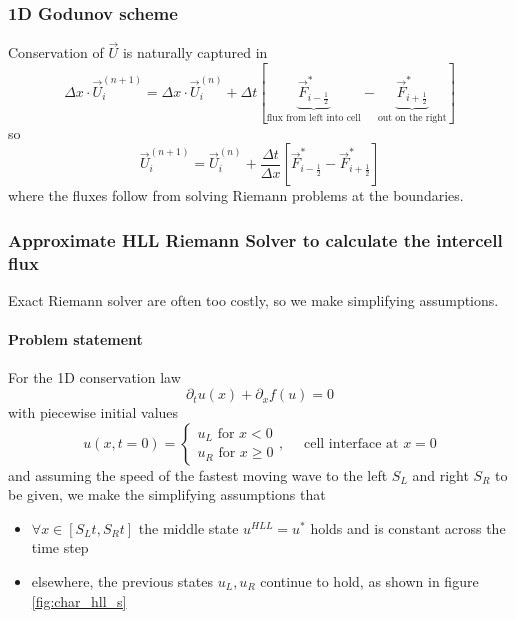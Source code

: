 \subsubsection*{1D Godunov scheme} Conservation of $\vec{U}$ is naturally captured in
\begin{equation}
    \Delta x \cdot \vec{U}_i^{(n+1)}= \Delta x \cdot \vec{U}_i^{(n)} + \Delta t \left[\underbrace{\vec{F}^*_{i-\frac{1}{2}}}_{\text{flux from left into cell}}-\underbrace{\vec{F}^*_{i+\frac{1}{2}}}_{\text{out on the right}}\right]
\end{equation}
so
\begin{equation}
    \vec{U}_i^{(n+1)}=\vec{U}_i^{(n)}+\frac{\Delta t}{\Delta x}\left[\vec{F}^*_{i-\frac{1}{2}}-\vec{F}^*_{i+\frac{1}{2}}\right]
\end{equation}
where the fluxes follow from solving Riemann problems at the boundaries.

\subsubsection*{Approximate HLL Riemann Solver to calculate the intercell flux}
Exact Riemann solver are often too costly, so we make simplifying assumptions.
\paragraph*{Problem statement} For the 1D conservation law
\begin{equation}
    \partial_t u(x) + \partial_x f(u) = 0
\end{equation}
with piecewise initial values
\begin{equation}
    u(x, t=0)=\left\{\begin{array}{l}
    u_L \text { for } x<0 \\
    u_R \text { for } x \geq 0
    \end{array}, \quad \text { cell interface at } x=0\right.
\end{equation}
and assuming the speed of the fastest moving wave to the left $S_L$ and
right $S_R$ to be given, we make the simplifying assumptions that
\begin{itemize}
    \item $\forall x \in [S_Lt,S_Rt]$ the middle state $u^{HLL} = u^*$ holds and is constant across the time step
    \item elsewhere, the previous states $u_L,u_R$ continue to hold, as shown in figure \ref{fig:char_hll_s}
\end{itemize}

